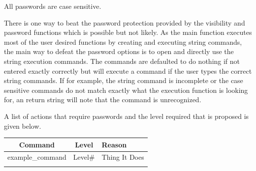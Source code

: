 All passwords are case sensitive.

There is one way to beat the password protection provided by the visibility and password functions which is possible but not likely. As the main function executes most of the user desired functions by creating and executing string commands, the main way to defeat the password options is to open and directly use the string execution commands. The commands are defaulted to do nothing if not entered exactly correctly but will execute a command if the user types the correct string commands. If for example, the string command is incomplete or the case sensitive commands do not match exactly what the execution function is looking for, an return string will note that the command is unrecognized. 

A list of actions that require passwords and the level required that is proposed is given below.

\begin{longtable}{ccl}
Command				& Level  	& Reason										\\
\hline
example\_command & Level\# & Thing It Does	\\
\hline
\label{Tab:PasswordDetails}\end{longtable}

\newpage

